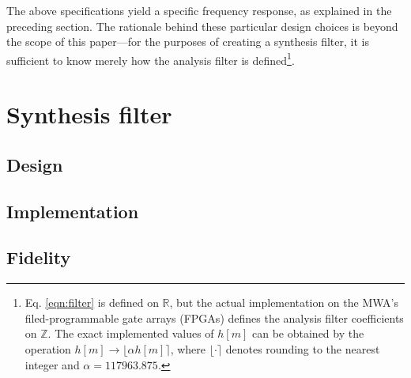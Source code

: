 \documentclass{pasa}%
\begin{document}
The above specifications yield a specific frequency response, as explained in the preceding section.
The rationale behind these particular design choices is beyond the scope of this paper---for the purposes of creating a synthesis filter, it is sufficient to know merely how the analysis filter is defined\footnote{Eq. \eqref{eqn:filter} is defined on $\mathbb{R}$, but the actual implementation on the MWA's filed-programmable gate arrays (FPGAs) defines the analysis filter coefficients on $\mathbb{Z}$. The exact implemented values of $h[m]$ can be obtained by the operation $h[m] \rightarrow \lfloor\alpha h[m]\rceil$, where $\lfloor\cdot\rceil$ denotes rounding to the nearest integer and $\alpha = 117963.875$.}.

\section{Synthesis filter}
\label{sec:ipfb}

\subsection{Design}

\subsection{Implementation}

\subsection{Fidelity}
\end{document}
